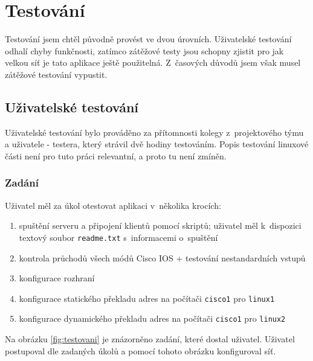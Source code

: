 \chapter{Testování}


Testování jsem chtěl původně provést ve dvou úrovních. Uživatelské testování odhalí chyby funkčnosti, zatímco zátěžové testy jsou schopny zjistit pro jak velkou síť je tato aplikace ještě použitelná. Z~časových důvodů jsem však musel zátěžové testování vypustit.

\section{Uživatelské testování}
Uživatelské testování bylo prováděno za přítomnosti kolegy z~projektového týmu a uživatele - testera, který strávil dvě hodiny testováním. Popis testování linuxové části není pro tuto práci relevantní, a proto tu není zmíněn.

\subsection{Zadání}
Uživatel měl za úkol otestovat aplikaci v~několika krocích:
\begin{enumerate}
 \item spuštění serveru a připojení klientů pomocí skriptů; uživatel měl k~dispozici textový soubor \verb|readme.txt| s~informacemi o~spuštění
 \item kontrola průchodů všech módů Cisco IOS + testování nestandardních vstupů
 \item konfigurace rozhraní
 \item konfigurace statického překladu adres na počítači \verb|cisco1| pro \verb|linux1|
 \item konfigurace dynamického překladu adres na počítači \verb|cisco1| pro \verb|linux2|
\end{enumerate}

Na obrázku \ref{fig:testovani} je znázorněno zadání, které dostal uživatel. Uživatel postupoval dle zadaných úkolů a pomocí tohoto obrázku konfiguroval síť.

